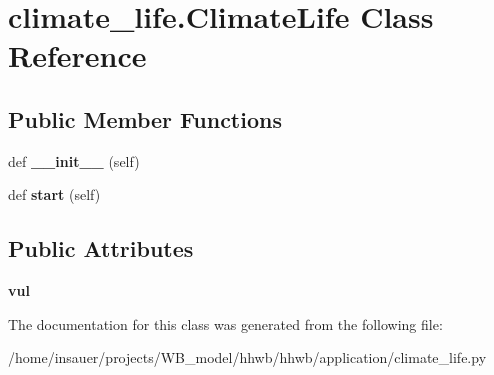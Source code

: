 \hypertarget{classclimate__life_1_1ClimateLife}{}\section{climate\+\_\+life.\+Climate\+Life Class Reference}
\label{classclimate__life_1_1ClimateLife}
\subsection*{Public Member Functions}
\begin{DoxyCompactItemize}
\item 
\mbox{\label{classclimate__life_1_1ClimateLife_a587cb9ad089df966ec5582af3b256f30}} 
def {\bfseries \+\_\+\+\_\+init\+\_\+\+\_\+} (self)
\item 
\mbox{\label{classclimate__life_1_1ClimateLife_a4de90962fc1944e169fefaf7e64f880b}} 
def {\bfseries start} (self)
\end{DoxyCompactItemize}
\subsection*{Public Attributes}
\begin{DoxyCompactItemize}
\item 
\mbox{\label{classclimate__life_1_1ClimateLife_ab6196f7fa6035efafd01e78c8f56083f}} 
{\bfseries vul}
\end{DoxyCompactItemize}


The documentation for this class was generated from the following file\+:\begin{DoxyCompactItemize}
\item 
/home/insauer/projects/\+W\+B\+\_\+model/hhwb/hhwb/application/climate\+\_\+life.\+py\end{DoxyCompactItemize}

